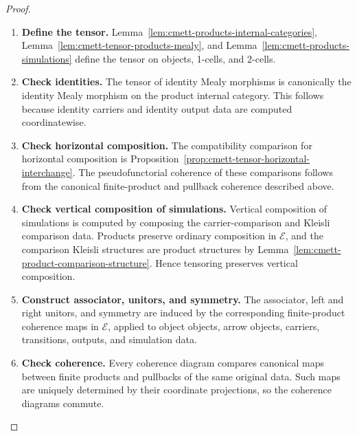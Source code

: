 \begin{proof}
    \leavevmode
    \begin{enumerate}
        \item \textbf{Define the tensor.}
        Lemma~\ref{lem:cmett-products-internal-categories},
        Lemma~\ref{lem:cmett-tensor-products-mealy}, and
        Lemma~\ref{lem:cmett-products-simulations} define the tensor on
        objects, 1-cells, and 2-cells.

        \item \textbf{Check identities.}
        The tensor of identity Mealy morphisms is canonically the identity
        Mealy morphism on the product internal category. This follows because
        identity carriers and identity output data are computed
        coordinatewise.

        \item \textbf{Check horizontal composition.}
        The compatibility comparison for horizontal composition is
        Proposition~\ref{prop:cmett-tensor-horizontal-interchange}. The
        pseudofunctorial coherence of these comparisons follows from the
        canonical finite-product and pullback coherence described above.

        \item \textbf{Check vertical composition of simulations.}
        Vertical composition of simulations is computed by composing the
        carrier-comparison and Kleisli comparison data. Products preserve
        ordinary composition in \(\mathcal E\), and the comparison Kleisli
        structures are product structures by
        Lemma~\ref{lem:cmett-product-comparison-structure}. Hence tensoring
        preserves vertical composition.

        \item \textbf{Construct associator, unitors, and symmetry.}
        The associator, left and right unitors, and symmetry are induced by
        the corresponding finite-product coherence maps in \(\mathcal E\),
        applied to object objects, arrow objects, carriers, transitions,
        outputs, and simulation data.

        \item \textbf{Check coherence.}
        Every coherence diagram compares canonical maps between finite
        products and pullbacks of the same original data. Such maps are
        uniquely determined by their coordinate projections, so the coherence
        diagrams commute.
    \end{enumerate}
\end{proof}

